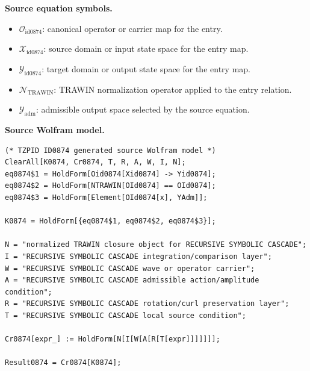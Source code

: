 \begin{minipage}[t]{0.49\linewidth}
\begingroup
\small
\raggedright
\textbf{Source equation symbols.}\par
\begin{itemize}[leftmargin=1.35em,itemsep=1pt,topsep=1pt,parsep=0pt]
    \item $\mathcal{O}_{\mathrm{id0874}}$: canonical operator or carrier map for the entry.
    \item $\mathcal{X}_{\mathrm{id0874}}$: source domain or input state space for the entry map.
    \item $\mathcal{Y}_{\mathrm{id0874}}$: target domain or output state space for the entry map.
    \item $\mathcal{N}_{\mathrm{TRAWIN}}$: TRAWIN normalization operator applied to the entry relation.
    \item $\mathcal{Y}_{\mathrm{adm}}$: admissible output space selected by the source equation.
\end{itemize}
\endgroup
\end{minipage}\hfill
\begin{minipage}[t]{0.47\linewidth}
\begingroup
\scriptsize
\raggedright
\textbf{Source Wolfram model.}\par
\begin{Verbatim}[fontsize=\tiny,breaklines=true,breakanywhere=true]
(* TZPID ID0874 generated source Wolfram model *)
ClearAll[K0874, Cr0874, T, R, A, W, I, N];
eq0874$1 = HoldForm[Oid0874[Xid0874] -> Yid0874];
eq0874$2 = HoldForm[NTRAWIN[OId0874] == OId0874];
eq0874$3 = HoldForm[Element[OId0874[x], YAdm]];

K0874 = HoldForm[{eq0874$1, eq0874$2, eq0874$3}];

N = "normalized TRAWIN closure object for RECURSIVE SYMBOLIC CASCADE";
I = "RECURSIVE SYMBOLIC CASCADE integration/comparison layer";
W = "RECURSIVE SYMBOLIC CASCADE wave or operator carrier";
A = "RECURSIVE SYMBOLIC CASCADE admissible action/amplitude condition";
R = "RECURSIVE SYMBOLIC CASCADE rotation/curl preservation layer";
T = "RECURSIVE SYMBOLIC CASCADE local source condition";

Cr0874[expr_] := HoldForm[N[I[W[A[R[T[expr]]]]]]];

Result0874 = Cr0874[K0874];
\end{Verbatim}
\endgroup
\end{minipage}

